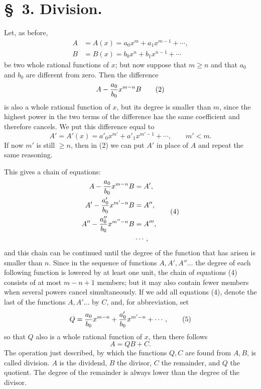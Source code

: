 \documentclass[11pt]{article}
\begin{document}
\section*{\S~3. Division.}

Let, as before,
\begin{equation}
\begin{aligned}
 A&=A(x)=a_0x^m+a_1x^{m-1}+\cdots,\\
 B&=B(x)=b_0x^n+b_1x^{n-1}+\cdots
\end{aligned}
\tag{1}
\end{equation}
be two whole rational functions of $x$; but now suppose that $m\ge n$ and that $a_0$ and $b_0$ are different from zero. Then the difference
\begin{equation}
 A-{a_0\over b_0}x^{m-n}B
\tag{2}
\end{equation}
is also a whole rational function of $x$, but its degree is smaller than $m$, since the highest power in the two terms of the difference has the same coefficient and therefore cancels. We put this difference equal to
\begin{equation}
 A'=A'(x)=a'_0x^{m'}+a'_1x^{m'-1}+\cdots,
 \qquad m'<m.
\tag{3}
\end{equation}
If now $m'$ is still $\ge n$, then in (2) we can put $A'$ in place of $A$ and repeat the same reasoning.

This gives a chain of equations:
\begin{equation}
\begin{aligned}
 A-{a_0\over b_0}x^{m-n}B&=A',\\
 A'-{a'_0\over b_0}x^{m'-n}B&=A'',\\
 A''-{a''_0\over b_0}x^{m''-n}B&=A''',\\
 &\cdots,
\end{aligned}
\tag{4}
\end{equation}
and this chain can be continued until the degree of the function that has arisen is smaller than $n$. Since in the sequence of functions $A,A',A''\ldots$ the degree of each following function is lowered by at least one unit, the chain of equations (4) consists of at most $m-n+1$ members; but it may also contain fewer members when several powers cancel simultaneously. If we add all equations (4), denote the last of the functions $A,A'\ldots$ by $C$, and, for abbreviation, set
\begin{equation}
 Q={a_0\over b_0}x^{m-n}+{a'_0\over b_0}x^{m'-n}+\cdots,
\tag{5}
\end{equation}
so that $Q$ also is a whole rational function of $x$, then there follows
\begin{equation}
 A=QB+C.
\tag{6}
\end{equation}
The operation just described, by which the functions $Q,C$ are found from $A,B$, is called division. $A$ is the dividend, $B$ the divisor, $C$ the remainder, and $Q$ the quotient. The degree of the remainder is always lower than the degree of the divisor.
\end{document}
